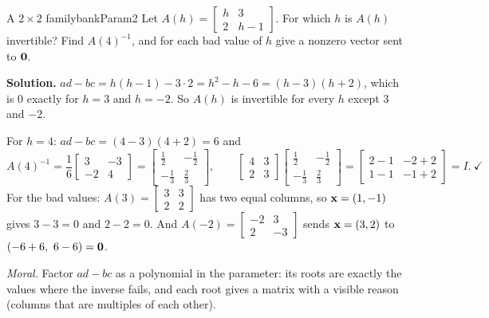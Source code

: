 \documentclass[11pt]{article}
\begin{document}
\begin{exmp}{A $2\times2$ family}{bankParam2}
Let $A(h)=\begin{bmatrix}h&3\\2&h-1\end{bmatrix}$. For which $h$ is $A(h)$ invertible? Find $A(4)^{-1}$, and for each bad value of $h$ give a nonzero vector sent to $\mathbf{0}$.

\textbf{Solution.} $ad-bc=h(h-1)-3\cdot2=h^2-h-6=(h-3)(h+2)$, which is $0$ exactly for $h=3$ and $h=-2$. So $A(h)$ is invertible for every $h$ except $3$ and $-2$.

For $h=4$: $ad-bc=(4-3)(4+2)=6$ and
\[
A(4)^{-1}=\frac16\begin{bmatrix}3&-3\\-2&4\end{bmatrix}=\begin{bmatrix}\tfrac12&-\tfrac12\\-\tfrac13&\tfrac23\end{bmatrix},
\qquad
\begin{bmatrix}4&3\\2&3\end{bmatrix}\begin{bmatrix}\tfrac12&-\tfrac12\\-\tfrac13&\tfrac23\end{bmatrix}=\begin{bmatrix}2-1&-2+2\\1-1&-1+2\end{bmatrix}=I.\ \checkmark
\]
For the bad values: $A(3)=\begin{bmatrix}3&3\\2&2\end{bmatrix}$ has two equal columns, so $\mathbf{x}=(1,-1)$ gives $3-3=0$ and $2-2=0$. And $A(-2)=\begin{bmatrix}-2&3\\2&-3\end{bmatrix}$ sends $\mathbf{x}=(3,2)$ to $(-6+6,\ 6-6)=\mathbf{0}$.

\emph{Moral.} Factor $ad-bc$ as a polynomial in the parameter: its roots are exactly the values where the inverse fails, and each root gives a matrix with a visible reason (columns that are multiples of each other).
\end{exmp}
\end{document}
